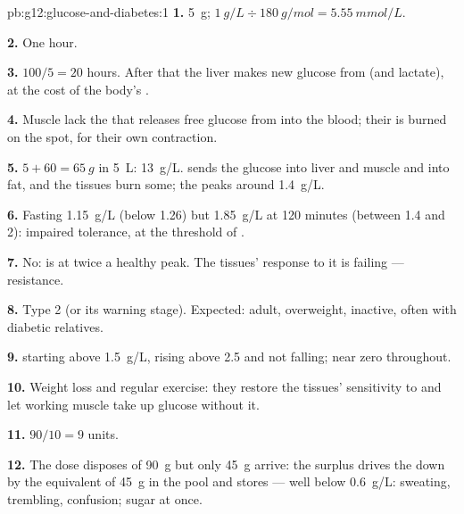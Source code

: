 \begin{solution}{pb:g12:glucose-and-diabetes:1}
\textbf{1.} \qty{5}{g}; $\qty{1}{g/L} \div \qty{180}{g/mol} = \qty{5.55}{mmol/L}$.

\textbf{2.} One hour.

\textbf{3.} $100/5 = 20$ hours. After that the liver makes new glucose
from  (and lactate), at the cost of the body's .

\textbf{4.} Muscle  lack the  that releases free glucose
from  into the blood; their  is burned on the spot,
for their own contraction.

\textbf{5.} $5 + 60 = \qty{65}{g}$ in \qty{5}{L}: \qty{13}{g/L}.
 sends the glucose into liver and muscle  and into fat,
and the tissues burn some; the  peaks around \qty{1.4}{g/L}.

\textbf{6.} Fasting \qty{1.15}{g/L} (below 1.26) but \qty{1.85}{g/L}
at 120 minutes (between 1.4 and 2): impaired tolerance, at the
threshold of .

\textbf{7.} No:  is at twice a healthy peak. The tissues' response
to it is failing ---  resistance.

\textbf{8.} Type 2 (or its warning stage). Expected: adult, overweight,
inactive, often with diabetic relatives.

\textbf{9.}  starting above \qty{1.5}{g/L}, rising above
\num{2.5} and not falling;  near zero throughout.

\textbf{10.} Weight loss and regular exercise: they restore the
tissues' sensitivity to  and let working muscle take up glucose
without it.

\textbf{11.} $90/10 = 9$ units.

\textbf{12.} The dose disposes of \qty{90}{g} but only \qty{45}{g}
arrive: the surplus  drives the  down by the
equivalent of \qty{45}{g} in the pool and stores --- well below
\qty{0.6}{g/L}: sweating, trembling, confusion; sugar at once.


\end{solution}
